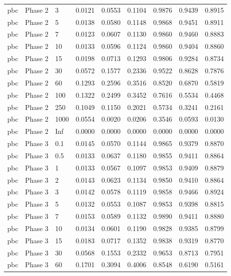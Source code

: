 \begin{tabular}{lllllllll}
  pbc & Phase 2 & 3 & 0.0121 & 0.0553 & 0.1104 & 0.9876 & 0.9439 & 0.8915 \\ 
  pbc & Phase 2 & 5 & 0.0138 & 0.0580 & 0.1148 & 0.9868 & 0.9451 & 0.8911 \\ 
  pbc & Phase 2 & 7 & 0.0123 & 0.0607 & 0.1130 & 0.9860 & 0.9460 & 0.8883 \\ 
  pbc & Phase 2 & 10 & 0.0133 & 0.0596 & 0.1124 & 0.9860 & 0.9404 & 0.8860 \\ 
  pbc & Phase 2 & 15 & 0.0198 & 0.0713 & 0.1293 & 0.9806 & 0.9284 & 0.8734 \\ 
  pbc & Phase 2 & 30 & 0.0572 & 0.1577 & 0.2336 & 0.9522 & 0.8628 & 0.7876 \\ 
  pbc & Phase 2 & 60 & 0.1293 & 0.2596 & 0.3516 & 0.8520 & 0.6870 & 0.5819 \\ 
  pbc & Phase 2 & 100 & 0.1322 & 0.2499 & 0.3452 & 0.7616 & 0.5534 & 0.4468 \\ 
  pbc & Phase 2 & 250 & 0.1049 & 0.1150 & 0.2021 & 0.5734 & 0.3241 & 0.2161 \\ 
  pbc & Phase 2 & 1000 & 0.0554 & 0.0020 & 0.0206 & 0.3546 & 0.0593 & 0.0130 \\ 
  pbc & Phase 2 & Inf & 0.0000 & 0.0000 & 0.0000 & 0.0000 & 0.0000 & 0.0000 \\ 
  pbc & Phase 3 & 0.1 & 0.0145 & 0.0570 & 0.1144 & 0.9865 & 0.9379 & 0.8870 \\ 
  pbc & Phase 3 & 0.5 & 0.0133 & 0.0637 & 0.1180 & 0.9855 & 0.9411 & 0.8864 \\ 
  pbc & Phase 3 & 1 & 0.0133 & 0.0567 & 0.1097 & 0.9853 & 0.9409 & 0.8879 \\ 
  pbc & Phase 3 & 2 & 0.0143 & 0.0623 & 0.1134 & 0.9850 & 0.9410 & 0.8864 \\ 
  pbc & Phase 3 & 3 & 0.0142 & 0.0578 & 0.1119 & 0.9858 & 0.9466 & 0.8924 \\ 
  pbc & Phase 3 & 5 & 0.0132 & 0.0553 & 0.1087 & 0.9853 & 0.9398 & 0.8815 \\ 
  pbc & Phase 3 & 7 & 0.0153 & 0.0589 & 0.1132 & 0.9890 & 0.9411 & 0.8880 \\ 
  pbc & Phase 3 & 10 & 0.0134 & 0.0601 & 0.1190 & 0.9828 & 0.9385 & 0.8799 \\ 
  pbc & Phase 3 & 15 & 0.0183 & 0.0717 & 0.1352 & 0.9838 & 0.9319 & 0.8770 \\ 
  pbc & Phase 3 & 30 & 0.0568 & 0.1553 & 0.2332 & 0.9653 & 0.8713 & 0.7951 \\ 
  pbc & Phase 3 & 60 & 0.1701 & 0.3094 & 0.4006 & 0.8548 & 0.6190 & 0.5161 \\ 

\end{tabular}
